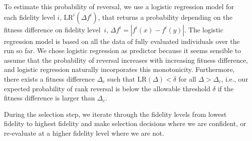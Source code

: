 To estimate this probability of reversal, we use a logistic regression model for each fidelity level $i$, $\mbox{LR}^i(\Delta f^i)$, that returns a probability depending on the fitness difference on fidelity level~$i$, $\Delta f^i =|f^i(x)-f^i(y)|$. The logistic regression model is based on all the data of fully evaluated individuals over the run so far. We chose logistic regression as predictor because it seems sensible to assume that the probability of reversal increases with increasing fitness difference, and logistic regression naturally incorporates this monotonicity. Furthermore, there exists a fitness difference $\Delta_c$ such that $\mbox{LR}(\Delta)<\delta$ for all $\Delta > \Delta_c$, i.e., our expected probability of rank reversal is below the allowable threshold $\delta$ if the fitness difference is larger than $\Delta_c$. 


During the selection step, we iterate through the fidelity levels from lowest fidelity to highest fidelity and make selection decisions where we are confident, or re-evaluate at a higher fidelity level where we are not.

